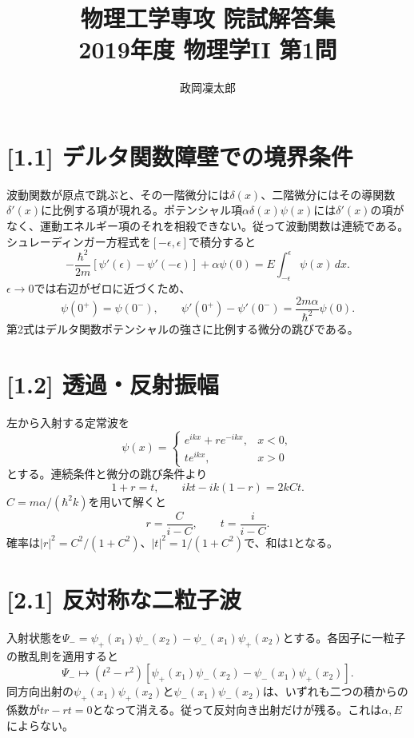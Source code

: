 \documentclass[11pt,a4paper]{article}
\title{物理工学専攻 院試解答集\\2019年度 物理学II 第1問}
\author{政岡凜太郎}
\date{}
\begin{document}
\maketitle

\section*{[1.1] デルタ関数障壁での境界条件}
波動関数が原点で跳ぶと、その一階微分には$\delta(x)$、二階微分にはその導関数$\delta'(x)$に比例する項が現れる。ポテンシャル項$\alpha\delta(x)\psi(x)$には$\delta'(x)$の項がなく、運動エネルギー項のそれを相殺できない。従って波動関数は連続である。シュレーディンガー方程式を$[-\epsilon,\epsilon]$で積分すると
\begin{equation}
 -\frac{\hbar^2}{2m}\left[\psi'(\epsilon)-\psi'(-\epsilon)\right]
 +\alpha\psi(0)=E\int_{-\epsilon}^{\epsilon}\psi(x)\,dx.
\end{equation}
$\epsilon\to0$では右辺がゼロに近づくため、
\begin{equation}
 \boxed{\psi(0^+)=\psi(0^-)},\qquad
 \boxed{\psi'(0^+)-\psi'(0^-)=\frac{2m\alpha}{\hbar^2}\psi(0)}.
\end{equation}
第2式はデルタ関数ポテンシャルの強さに比例する微分の跳びである。

\section*{[1.2] 透過・反射振幅}
左から入射する定常波を
\begin{equation}
 \psi(x)=\begin{cases}e^{ikx}+re^{-ikx},&x<0,\\ te^{ikx},&x>0\end{cases}
\end{equation}
とする。連続条件と微分の跳び条件より
\begin{equation}
 1+r=t,\qquad ikt-ik(1-r)=2kCt.
\end{equation}
$C=m\alpha/(\hbar^2k)$を用いて解くと
\begin{equation}
 \boxed{r=\frac{C}{i-C}},\qquad
 \boxed{t=\frac{i}{i-C}}.
\end{equation}
確率は$|r|^2=C^2/(1+C^2)$、$|t|^2=1/(1+C^2)$で、和は1となる。

\section*{[2.1] 反対称な二粒子波}
入射状態を$\Psi_-=\psi_+(x_1)\psi_-(x_2)-\psi_-(x_1)\psi_+(x_2)$とする。各因子に一粒子の散乱則を適用すると
\begin{equation}
 \Psi_-\longmapsto(t^2-r^2)\left[\psi_+(x_1)\psi_-(x_2)-\psi_-(x_1)\psi_+(x_2)\right].
\end{equation}
同方向出射の$\psi_+(x_1)\psi_+(x_2)$と$\psi_-(x_1)\psi_-(x_2)$は、いずれも二つの積からの係数が$tr-rt=0$となって消える。従って反対向き出射だけが残る。これは$\alpha,E$によらない。
\end{document}
